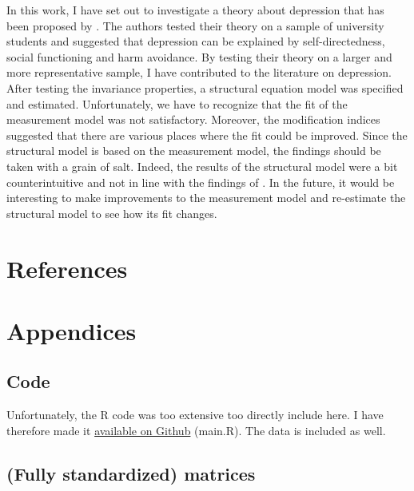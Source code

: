 \documentclass[11pt]{article}
\begin{document}
In this work, I have set out to investigate a theory about depression that has
been proposed by \textcite{tse2011}. The authors tested their theory on a sample
of university students and suggested that depression can be explained by
self-directedness, social functioning and harm avoidance. By testing their
theory on a larger and more representative sample, I have contributed to the
literature on depression. After testing the invariance properties, a structural
equation model was specified and estimated. Unfortunately, we have to recognize
that the fit of the measurement model was not satisfactory. Moreover, the
modification indices suggested that there are various places where the fit
could be improved. Since the structural model is based on the measurement model,
the findings should be taken with a grain of salt. Indeed, the results of the
structural model were a bit counterintuitive and not in line with the findings
of \textcite{tse2011}. In the future, it would be interesting to make
improvements to the measurement model and re-estimate the structural model to
see how its fit changes.

\FloatBarrier\pagebreak\section{References}
\printbibliography[heading=none]

\FloatBarrier\pagebreak\section{Appendices}
\subsection{Code}

Unfortunately, the R code was too extensive too directly include here. I have
therefore made it \href{https://github.com/vandenbroecksebastiaan/SEM/}{available on Github}
(main.R). The data is included as well.

\subsection{(Fully standardized) matrices}
\end{document}
